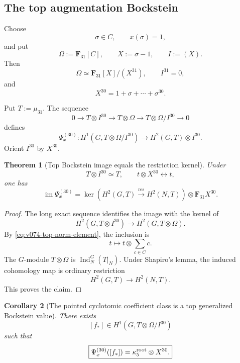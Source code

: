 \documentclass[11pt]{article}
\newtheorem{theorem}{Theorem}[section]
\newtheorem{corollary}[theorem]{Corollary}
\theoremstyle{remark}
\begin{document}
\subsection{The top augmentation Bockstein}

Choose
\[
 \sigma\in C,\qquad x(\sigma)=1,
\]
and put
\[
 \Omega:=\mathbf F_{31}[C],
 \qquad
 X:=\sigma-1,
 \qquad
 I:=(X).
\]
Then
\[
 \Omega\simeq\mathbf F_{31}[X]/(X^{31}),
 \qquad I^{31}=0,
\]
and
\begin{equation}
 \boxed{
 X^{30}
 =
 1+\sigma+\cdots+\sigma^{30}.}
 \label{eq:v074-top-norm-element}
\end{equation}

Put \(T:=\mu_{31}\).  The sequence
\[
 0\longrightarrow T\otimes I^{30}
 \longrightarrow T\otimes\Omega
 \longrightarrow T\otimes\Omega/I^{30}
 \longrightarrow0
\]
defines
\begin{equation}
 \boxed{
 \Psi_x^{(30)}:
 H^1(G,T\otimes\Omega/I^{30})
 \longrightarrow
 H^2(G,T)\otimes I^{30}.}
 \label{eq:v074-top-augmentation-bockstein}
\end{equation}
Orient \(I^{30}\) by \(X^{30}\).

\begin{theorem}[Top Bockstein image equals the restriction kernel]
\label{thm:v074-top-bockstein-image}
Under
\[
 T\otimes I^{30}\simeq T,
 \qquad
 t\otimes X^{30}\longleftrightarrow t,
\]
one has
\begin{equation}
 \boxed{
 \operatorname{im}\Psi_x^{(30)}
 =
 \ker\!\left(
 H^2(G,T)\xrightarrow{\operatorname{res}}
 H^2(N,T)
 \right)\otimes\mathbf F_{31}X^{30}.}
 \label{eq:v074-top-bockstein-kernel}
\end{equation}
\end{theorem}

\begin{proof}
The long exact sequence identifies the image with the kernel of
\[
 H^2(G,T\otimes I^{30})
 \longrightarrow
 H^2(G,T\otimes\Omega).
\]
By \eqref{eq:v074-top-norm-element}, the inclusion is
\[
 t\longmapsto
 t\otimes\sum_{c\in C}c.
\]
The \(G\)-module \(T\otimes\Omega\) is
\(\operatorname{Ind}_{N}^{G}(T|_N)\).
Under Shapiro's lemma, the induced cohomology map is ordinary restriction
\[
 H^2(G,T)\longrightarrow H^2(N,T).
\]
This proves the claim.
\end{proof}

\begin{corollary}[The pointed cyclotomic coefficient class is a top generalized Bockstein
value]
\label{cor:v074-kappa-is-top-bockstein}
There exists
\begin{equation}
 \boxed{
 [f_*]
 \in
 H^1(G,T\otimes\Omega/I^{30})}
 \label{eq:v074-fstar}
\end{equation}
such that
\begin{equation}
 \boxed{
 \Psi_x^{(30)}([f_*])
 =
 \kappa_5^{\rm root}\otimes X^{30}.}
 \label{eq:v074-fstar-bockstein}
\end{equation}
\end{corollary}
\end{document}
